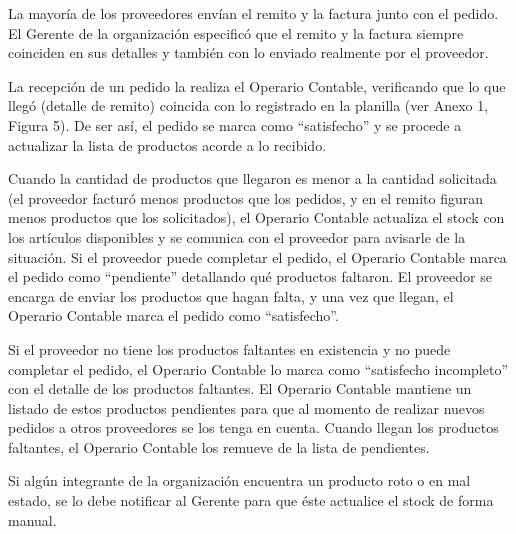 \documentclass[12pt]{extarticle}
\begin{document}
\begin{spacing}{1.2}
    La mayoría de los proveedores envían el remito y la factura junto con el pedido. El Gerente de la organización especificó que el remito y la factura siempre coinciden en sus detalles y también con lo enviado realmente por el proveedor. 
    
    La recepción de un pedido la realiza el Operario Contable, verificando que lo que llegó (detalle de remito) coincida con lo registrado en la planilla (ver Anexo 1, Figura 5). De ser así, el pedido se marca como ``satisfecho'' y se procede a actualizar la lista de productos acorde a lo recibido.

    Cuando la cantidad de productos que llegaron es menor a la cantidad solicitada (el proveedor facturó menos productos que los pedidos, y en el remito figuran menos productos que los solicitados), el Operario Contable actualiza el stock con los artículos disponibles y se comunica con el proveedor para avisarle de la situación. Si el proveedor puede completar el pedido, el Operario Contable marca el pedido como ``pendiente'' detallando qué productos faltaron. El proveedor se encarga de enviar los productos que hagan falta, y una vez que llegan, el Operario Contable marca el pedido como ``satisfecho''.  


    Si el proveedor no tiene los productos faltantes en existencia y no puede completar el pedido, el Operario Contable lo marca como ``satisfecho incompleto'' con el detalle de los productos faltantes. El Operario Contable  mantiene un listado de estos productos pendientes para que al momento de realizar nuevos pedidos a otros proveedores se los tenga en cuenta. Cuando llegan los productos faltantes, el Operario Contable los remueve de la lista de pendientes.


    Si algún integrante de la organización encuentra un producto roto o en mal estado, se lo debe notificar al Gerente para que éste actualice el stock de forma manual.

    
    
    \pagebreak


\end{spacing}
\end{document}
